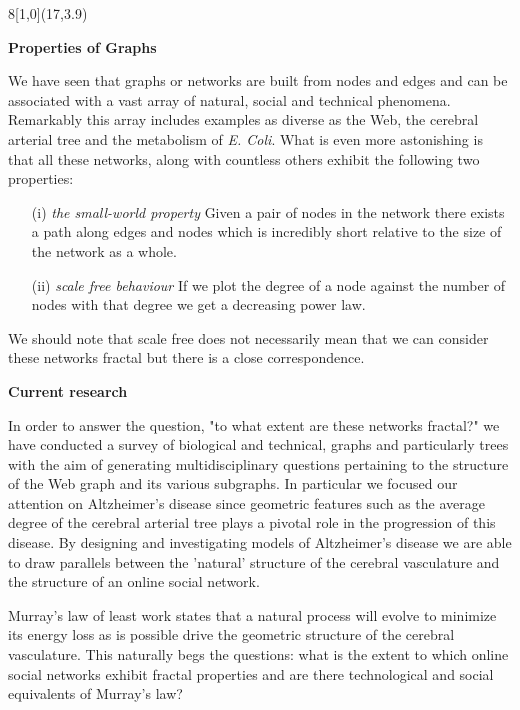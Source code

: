 \documentclass[a1,portrait]{a0poster}
\def\Head#1{{\noindent\raggedright{\large\textsf{\textbf{#1}}}\par}}
\begin{document}
\begin{textblock}{8}[1,0](17,3.9)



\Head{Properties of Graphs}
We have seen that graphs or networks are built from nodes and edges and can be associated with a vast array of natural, social and technical phenomena.  Remarkably this array includes examples as diverse as the Web, the cerebral arterial tree and the metabolism of \emph{E. Coli}.  What is even more astonishing is that all these networks, along with countless others exhibit the following two properties:

\begin{itemize}
\item[(i)] \emph{ the small-world property} Given a pair of nodes in the network there exists a path along edges and nodes which is incredibly short relative to the size of the network as a whole.
\item[(ii)] \emph{scale free behaviour}  If we plot the degree of a node against the number of nodes with that degree we get a decreasing power law.
\end{itemize}

We should note that scale free does not necessarily mean that we can consider these networks fractal but there is a close correspondence.  

\Head{Current research}

In order to answer the question, "to what extent are these networks fractal?" we have conducted a survey of biological and technical, graphs and particularly trees with the aim of generating multidisciplinary questions pertaining to the structure of the Web graph and its various subgraphs.  In particular we focused our attention on Altzheimer's disease since geometric features such as the average degree of the cerebral arterial tree plays a pivotal role in the progression of this disease.  By designing and investigating models of Altzheimer's disease we are able to draw parallels between the 'natural' structure of the cerebral vasculature and the structure of an online social network. 

Murray's law of  least work\cite{} states that a natural process will evolve to minimize its energy loss as is possible drive the geometric structure of the cerebral vasculature.  This naturally begs the questions: what is the extent to which online social networks exhibit fractal properties and are there technological and social equivalents of Murray's law? 


\end{textblock}
\end{document}
